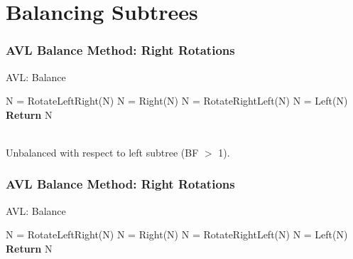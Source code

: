 \documentclass{beamer}
\begin{document}
\section{Balancing Subtrees}
\begin{frame}[fragile]
    \frametitle{AVL Balance Method: Right Rotations}
    \begin{minipage}{0.44\textwidth}
        \begin{algorithm}[H]
            \caption{AVL: Balance}
            \scriptsize
            \begin{algorithmic}[1]
                \color{red}
                \State N = RotateLeftRight(N)
                \Else
                \State N = Right(N)
                \EndIf
                \color{black}
                \State N = RotateRightLeft(N)
                \Else
                \State N = Left(N)
                \EndIf
                \EndIf
                \State \textbf{Return} N
                \EndProcedure
            \end{algorithmic}
        \end{algorithm}
    \end{minipage}
    \hfill
    \begin{minipage}{0.44\textwidth}
    \end{minipage}
    \vfill
    \\Unbalanced with respect to left subtree (BF $>$ 1).
    \vfill

    \end{frame}
\begin{frame}[fragile]
    \frametitle{AVL Balance Method: Right Rotations}
    \begin{minipage}{0.44\textwidth}
        \begin{algorithm}[H]
            \caption{AVL: Balance}
            \scriptsize
            \begin{algorithmic}[1]
                \color{orange}
                \State N = RotateLeftRight(N)
                \color{blue}
                \Else
                \State N = Right(N)
                \EndIf
                \color{black}
                \State N = RotateRightLeft(N)
                \Else
                \State N = Left(N)
                \EndIf
                \EndIf
                \State \textbf{Return} N
                \EndProcedure
            \end{algorithmic}
        \end{algorithm}
    \end{minipage}
    \hfill
    \begin{minipage}{0.44\textwidth}
    \end{minipage}
    \end{frame}
\end{document}
